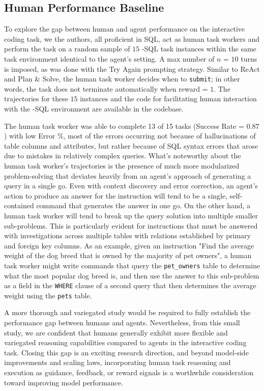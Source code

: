 

\subsection{Human Performance Baseline}
\label{appx:experiments:human_perf}

To explore the gap between human and agent performance on the interactive coding task, we the authors, all proficient in SQL, act as human task workers and perform the task on a random sample of $15$ \benchmark{}-SQL task instances within the same task environment identical to the agent's setting. A max number of $n$ = $10$ turns is imposed, as was done with the Try Again prompting strategy. Similar to ReAct and Plan \& Solve, the human task worker decides when to \texttt{submit}; in other words, the task does not terminate automatically when reward = $1$. The trajectories for these $15$ instances and the code for facilitating human interaction with the \benchmark{}-SQL environment are available in the codebase.

The human task worker was able to complete 13 of 15 tasks (Success Rate = $0.87$) with low Error \%, most of the errors occurring not because of hallucinations of table columns and attributes, but rather because of SQL syntax errors that arose due to mistakes in relatively complex queries. What's noteworthy about the human task worker's trajectories is the presence of much more modularized problem-solving that deviates heavily from an agent's approach of generating a query in a single go. Even with context discovery and error correction, an agent's action to produce an answer for the instruction will tend to be a single, self-contained command that generates the answer in one go. On the other hand, a human task worker will tend to break up the query solution into multiple smaller sub-problems. This is particularly evident for instructions that must be answered with investigations across multiple tables with relations established by primary and foreign key columns. As an example, given an instruction "Find the average weight of the dog breed that is owned by the majority of pet owners", a human task worker might write commands that query the \texttt{pet\_owners} table to determine what the most popular dog breed is, and then use the answer to this sub-problem as a field in the \texttt{WHERE} clause of a second query that then determines the average weight using the \texttt{pets} table.

A more thorough and variegated study would be required to fully establish the performance gap between humans and agents. Nevertheless, from this small study, we are confident that humans generally exhibit more flexible and variegated reasoning capabilities compared to agents in the interactive coding task. Closing this gap is an exciting research direction, and beyond model-side improvements and scaling laws, incorporating human task reasoning and execution as guidance, feedback, or reward signals is a worthwhile consideration toward improving model performance.

